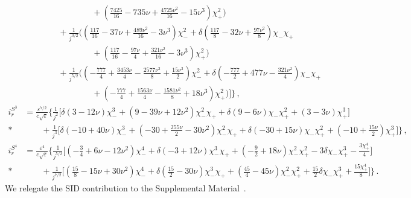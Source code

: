 \documentclass[prd,superscriptaddress,preprintnumbers,tightenlines,nofootinbib, eqsecnum]{revtex4-2}
\newcommand{\nn}{\nonumber}
\begin{document}
\begin{subequations}
\begin{align}
   &\qquad\qquad\qquad\qquad +\left(\frac{7425}{16}-735 \nu +\frac{4725 \nu ^2}{16}-15 \nu ^3\right) \chi_{+}^2\Bigg)\nn\\
   &\qquad\qquad+\frac{1}{j^{3/2}}\Bigg(\left(\frac{117}{16}-37 \nu +\frac{489 \nu ^2}{16}-3 \nu ^3\right) \chi_{-}^2+\delta  \left(\frac{117}{8}-32 \nu +\frac{97 \nu ^2}{8}\right) \chi_{-}
   \chi_{+} \nn\\
   &\qquad\qquad\qquad\qquad +\left(\frac{117}{16}-\frac{97 \nu }{4}+\frac{321 \nu ^2}{16}-3 \nu ^3\right) \chi_{+}^2\Bigg)\nn\\
   &\qquad\qquad  +\frac{1}{j^{5/2}}\Bigg(\left(-\frac{777}{4}+\frac{3453 \nu }{4}-\frac{2577 \nu
   ^2}{8}+\frac{15 \nu ^3}{2}\right) \chi_{-}^2+\delta  \left(-\frac{777}{2}+477 \nu -\frac{321 \nu ^2}{4}\right) \chi_{-} \chi_{+} \nn\\
   &\qquad\qquad\qquad\qquad +\left(-\frac{777}{4}+\frac{1563 \nu
   }{4}-\frac{1581 \nu ^2}{8}+18 \nu ^3\right) \chi_{+}^2\Bigg)\Bigg]\Bigg\} \,,\\
   \label{seq:irS3_of_varpesilon_j_expression}
   i_r^{S^3} &= \frac{\varepsilon ^{7/2}}{c\sqrt{\varepsilon}} \Bigg\{\frac{1}{j^2}\Bigg[\delta  (3-12 \nu ) \chi_{-}^3+\left(9-39 \nu +12 \nu ^2\right) \chi_{-}^2 \chi_{+}+\delta  (9-6 \nu ) \chi_{-} \chi_{+}^2+(3-3 \nu
   ) \chi_{+}^3\Bigg]\nn\\*
   &\qquad +\frac{1}{j^3}\Bigg[\delta  (-10+40 \nu ) \chi_{-}^3+\left(-30+\frac{255 \nu }{2}-30 \nu ^2\right) \chi_{-}^2 \chi_{+}+\delta  (-30+15 \nu ) \chi_{-}
   \chi_{+}^2+\left(-10+\frac{15 \nu }{2}\right) \chi_{+}^3 \Bigg]\Bigg\} \,,\\
   \label{seq:irS4_of_varpesilon_j_expression}
   i_r^{S^4} &= \frac{\varepsilon^{4}}{c\sqrt{\varepsilon}}\Bigg\{  \frac{1}{j^{5/2}}\Bigg[\left(-\frac{3}{4}+6 \nu -12 \nu ^2\right) \chi_{-}^4+\delta  (-3+12 \nu ) \chi_{-}^3 \chi_{+}+\left(-\frac{9}{2}+18 \nu \right) \chi
   _-^2 \chi_{+}^2-3 \delta  \chi_{-} \chi_{+}^3-\frac{3 \chi_{+}^4}{4}\Bigg] \nn\\*
   &\qquad +\frac{1}{j^{7/2}}\Bigg[\left(\frac{15}{8}-15 \nu +30 \nu ^2\right) \chi_{-}^4+\delta 
   \left(\frac{15}{2}-30 \nu \right) \chi_{-}^3 \chi_{+}+\left(\frac{45}{4}-45 \nu \right) \chi_{-}^2 \chi_{+}^2+\frac{15}{2} \delta  \chi_{-} \chi
   _+^3+\frac{15 \chi_{+}^4}{8}\Bigg] \Bigg\} \,.
\end{align}
\end{subequations}
%
We relegate the SID contribution to the Supplemental Material~\cite{Supplemental}. 
\end{document}
